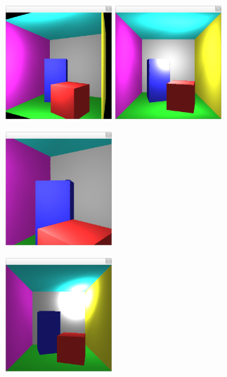 \documentclass{article}
\begin{document}
\begin{figure}[H]
    \centering
    \begin{minipage}{.5\textwidth}
        \centering
        \includegraphics[width=4cm]{ani1.png}
    \end{minipage}%
    \begin{minipage}{.5\textwidth}
        \centering
        \includegraphics[width=4cm]{light1.png}
    \end{minipage}
\end{figure}

\begin{figure}[H]
    \centering
    \begin{minipage}{.5\textwidth}
        \centering
        \includegraphics[width=4cm]{ani2.png}
        \label{fig:camera}
    \end{minipage}%
    \begin{minipage}{.5\textwidth}
        \centering
        \includegraphics[width=4cm]{light2.png}
        \label{fig:light}
    \end{minipage}
\end{figure}
\end{document}

